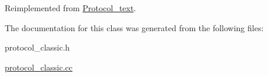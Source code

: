 Reimplemented from \mbox{\hyperlink{classProtocol__text_a66166244c73b0d710d2896c411514890}{Protocol\+\_\+text}}.



The documentation for this class was generated from the following files\+:\begin{DoxyCompactItemize}
\item 
protocol\+\_\+classic.\+h\item 
\mbox{\hyperlink{protocol__classic_8cc}{protocol\+\_\+classic.\+cc}}\end{DoxyCompactItemize}
